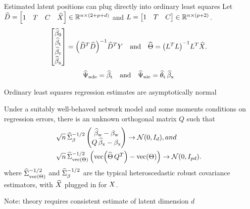 \documentclass[aspectratio=169]{beamer}
\theoremstyle{remark}
\begin{document}
\begin{frame}{Estimated latent positions can plug directly into ordinary least squares}
    Let $\widehat{D} = \begin{bmatrix} 1 & T & C  & \widehat{X} \end{bmatrix} \in \mathbb{R}^{n \times (2 + p + d)}$ and $L = \begin{bmatrix} 1 & T & C \end{bmatrix} \in \mathbb{R}^{n \times (p + 2)}$.
    \begin{equation*}
        \begin{bmatrix}
            \betazerohat \\
            \betathat    \\
            \betachat    \\
            \betaxhat
        \end{bmatrix}
        = \paren*{\Dhat^T \Dhat}^{-1} \Dhat^T Y
        \quad \text{and} \quad
        \Thetahat
        = \paren*{\Wfull^T \Wfull}^{-1} \Wfull^T \Xhat.
    \end{equation*}
    \begin{align*}
        \widehat{\Psi}_\mathrm{nde} = \widehat{\beta}_\text{t} \quad \text{and} \quad \widehat{\Psi}_\mathrm{nie} = \widehat{\theta}_\text{t} \, \widehat{\beta}_\text{x}
    \end{align*}
\end{frame}

\begin{frame}{Ordinary least squares regression estimates are asymptotically normal}
    \begin{theorem}
        Under a suitably well-behaved network model and some moments conditions on regression errors, there is an unknown orthogonal matrix $Q$ such that
        \begin{equation*}
            \begin{aligned}
                \sqrt{ n } \,
                 & \Sigmahatbeta^{-1/2}
                \begin{pmatrix}
                    \betawhat - \betaw \\
                    Q \, \betaxhat - \betax
                \end{pmatrix}
                \to
                \Normal{0}{I_d}, and     \\
                \sqrt{ n } \,
                 & \Sigmahattheta^{-1/2}
                \begin{pmatrix}
                    \vecc \paren*{\Thetahat \, Q^T} - \Thetavec
                \end{pmatrix}
                \to
                \Normal{0}{I_{p d}}.
            \end{aligned}
        \end{equation*}
        \noindent where $\widehat{\Sigma}_{\operatorname*{vec} \left(\Theta\right)}^{-1/2}$ and $\widehat{\Sigma}_\beta^{-1/2}$ are the typical heteroscedastic robust covariance estimators, with $\widehat{X}$ plugged in for $X$.
    \end{theorem}

    \centering
    Note: theory requires consistent estimate of latent dimension $d$
\end{frame}
\end{document}
